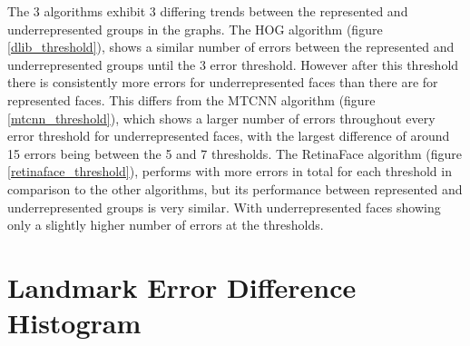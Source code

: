 \documentclass{l4proj}
\begin{document}
\begin{figure}[h!]
\end{figure}

The 3 algorithms exhibit 3 differing trends between the represented and underrepresented groups in the graphs. The HOG algorithm (figure \ref{dlib_threshold}), shows a similar number of errors between the represented and underrepresented groups until the 3 error threshold. However after this threshold there is consistently more errors for underrepresented faces than there are for represented faces. This differs from the MTCNN algorithm (figure \ref{mtcnn_threshold}), which shows a larger number of errors throughout every error threshold for underrepresented faces, with the largest difference of around 15 errors being between the 5 and 7 thresholds. The RetinaFace algorithm (figure \ref{retinaface_threshold}), performs with more errors in total for each threshold in comparison to the other algorithms, but its performance between represented and underrepresented groups is very similar. With underrepresented faces showing only a slightly higher number of errors at the thresholds.

\section{Landmark Error Difference Histogram}
\end{document}
